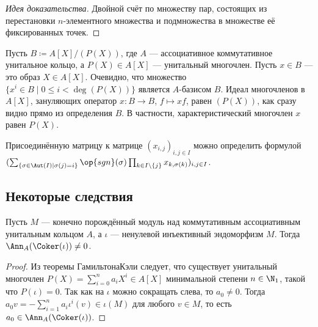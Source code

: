 \documentclass[
	extrafontsizes,
	11pt,
	hyphens,
]{memoir}
\begin{document}
\begin{proof}[Идея доказательства]
Двойной счёт по множеству пар, состоящих из перестановки \(n\)-элементного множества и подмножества в множестве её фиксированных точек.
\end{proof}

\begin{observation}
Пусть \(B \coloneqq A[X]/(P(X))\), где \(A\) --- ассоциативное коммутативное унитальное кольцо, а \(P(X) \in A[X]\) --- унитальный многочлен. Пусть \(x \in B\) --- это образ \(X \in A[X]\).
Очевидно, что множество \(\{x^i \in B \mid 0 \leq i < \deg(P(X))\}\) является \(A\)-базисом \(B\).
Идеал многочленов в \(A[X]\), зануляющих оператор
\(x : B \to B\), \(f \mapsto xf\),
равен \((P(X))\), как сразу видно прямо из определения \(B\).
В частности, характеристический многочлен \(x\) равен \(P(X)\).
\end{observation}

\begin{observation}
Присоединённую матрицу к матрице \((x_{i,j})_{i,j \in I}\) можно определить формулой
\(
(\sum_{\{\sigma \in \Aut(I) \mid \sigma(j) = i\}} \op{sgn}(\sigma) \prod_{k \in I \setminus \{j\}} x_{k,\sigma(k)})_{i,j \in I}
\).
\end{observation}

\subsection{Некоторые следствия}

\begin{theorem}
Пусть \(M\) --- конечно порождённый модуль над коммутативным ассоциативным унитальным кольцом \(A\),
а \(\iota\) --- ненулевой инъективный эндоморфизм \(M\).
\label{thm:FinGenModOverCommRingInj}
Тогда \(\Ann_A(\Coker(\iota)) \neq 0\).
\end{theorem}

\begin{proof}
Из теоремы Гамильтона\namedash{}Кэли следует, что существует унитальный многочлен \(P(X) = \sum_{i=0}^n a_i X^i \in A[X]\) минимальной степени \(n \in \N_1\),
такой что \(P(\iota) = 0\).
Так как на \(\iota\) можно сокращать слева, то \(a_0 \neq 0\).
Тогда \(a_0 v = -\sum_{i=1}^n a_i \iota^i(v) \in \iota(M)\) для любого \(v \in M\), то есть \(a_0 \in \Ann_A(\Coker(\iota))\).
\end{proof}
\end{document}
